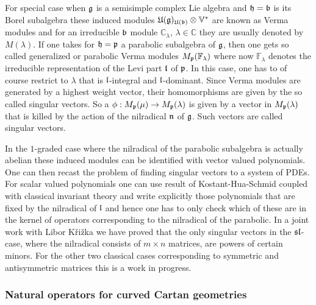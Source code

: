 \documentclass[12pt,a4paper,final]{report}
\begin{document}
For special case when $\mathfrak{g}$ is a semisimple complex Lie algebra and $\mathfrak{h} = \mathfrak{b}$ is  its Borel subalgebra these induced modules $\mathfrak{U(g)_{U(b)}}\otimes \mathbb{V}^*$ are known as Verma modules and for an irreducible $\mathfrak{b}$ module $\mathbb{C}_\lambda$, $\lambda \in \mathbb{C}$ they are usually denoted by $M(\lambda)$. If one takes for $\mathfrak{h} = \mathfrak{p}$ a parabolic subalgebra of $\mathfrak{g}$, then one gets so called generalized or parabolic Verma modules $M_{\mathfrak{p}} (\mathbb{F}_\lambda)$ where now $\mathbb{F}_\lambda$ denotes the irreducible representation of the Levi part $\mathfrak{l}$ of $\mathfrak{p}$. In this case, one has to of course restrict to $\lambda$ that is $\mathfrak{l}$-integral and $\mathfrak{l}$-dominant. Since Verma modules are generated by a highest weight vector, their homomorphisms are given by the so called singular vectors. So a $\phi: M_{\mathfrak{p}}(\mu) \to M_{\mathfrak{p}}(\lambda)$ is given by a vector in $M_{\mathfrak{p}}(\lambda)$ that is killed by the action of the nilradical $\mathfrak{n}$ of $\mathfrak{g}$. Such vectors are called singular vectors.

In the $1$-graded case where the nilradical of the parabolic subalgebra is actually abelian these induced modules can be identified with vector valued polynomials. One can then recast the problem of finding singular vectors to a system of PDEs. For scalar valued polynomials one can use result of Kostant-Hua-Schmid coupled with classical invariant theory and write explicitly those polynomials that are fixed by the nilradical of $\mathfrak{l}$ and hence one has to only check which of these are in the kernel of operators corresponding to the nilradical of the parabolic. In a joint work with Libor Křižka we have proved that the only singular vectors in the $\mathfrak{sl}$-case, where the nilradical consists of $m\times n$ matrices, are powers of certain minors. For the other two classical cases corresponding to symmetric and antisymmetric matrices this is a work in progress. 

\subsubsection{Natural operators for curved Cartan geometries}
\end{document}
